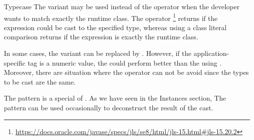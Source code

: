 \begin{pattern}{Typecase}
The  variant may be used instead of the  operator when the developer wants to match exactly the runtime class.
The  operator%
\footnote{\url{https://docs.oracle.com/javase/specs/jls/se8/html/jls-15.html\#jls-15.20.2}}
returns  if the expression could be cast to the specified type,
whereas using a class literal comparison returns  if the expression is exactly the runtime class.

In some cases, the  variant can be replaced by .
However, if the application-specific tag is a numeric value,
the  could perform better than the  using .
Moreover, there are situation where the  operator can not be avoid since the types to be cast are the same.


\related{}
The  pattern is a special of \thisp{}.
As we have seen in the \textsf{Instances} section,
The  pattern can be used occasionally 
to deconstruct the result of the cast.

\end{pattern}